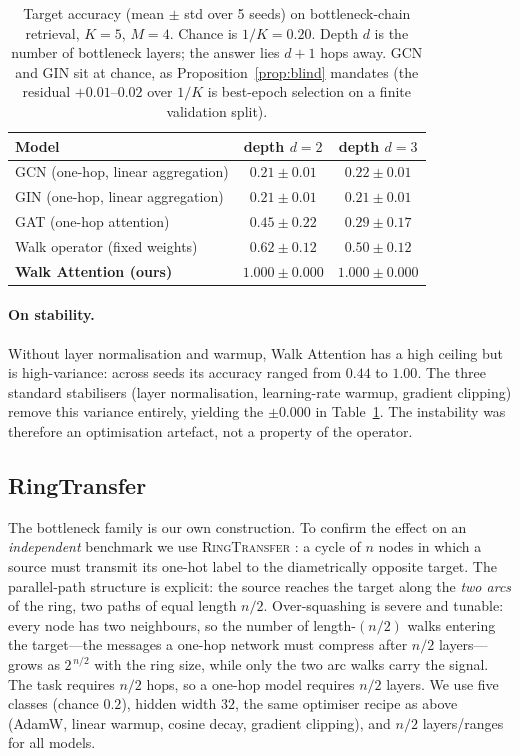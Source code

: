 \begin{table}[t]
\centering
\caption{Target accuracy (mean $\pm$ std over 5 seeds) on bottleneck-chain
retrieval, $K{=}5$, $M{=}4$. Chance is $1/K=0.20$. Depth $d$ is the number of
bottleneck layers; the answer lies $d{+}1$ hops away. GCN and GIN sit at
chance, as Proposition~\ref{prop:blind} mandates (the residual
$+0.01$--$0.02$ over $1/K$ is best-epoch selection on a finite validation
split).}
\label{tab:main}
\begin{tabular}{lcc}
\toprule
\textbf{Model} & \textbf{depth $d=2$} & \textbf{depth $d=3$} \\
\midrule
GCN (one-hop, linear aggregation)  & $0.21\pm0.01$ & $0.22\pm0.01$ \\
GIN (one-hop, linear aggregation)  & $0.21\pm0.01$ & $0.21\pm0.01$ \\
GAT (one-hop attention)            & $0.45\pm0.22$ & $0.29\pm0.17$ \\
Walk operator (fixed weights)      & $0.62\pm0.12$ & $0.50\pm0.12$ \\
\textbf{Walk Attention (ours)}     & $\mathbf{1.000\pm0.000}$ & $\mathbf{1.000\pm0.000}$ \\
\bottomrule
\end{tabular}
\end{table}

\paragraph{On stability.}
Without layer normalisation and warmup, Walk Attention has a high ceiling but is
high-variance: across seeds its accuracy ranged from $0.44$ to $1.00$. The three
standard stabilisers (layer normalisation, learning-rate warmup, gradient
clipping) remove this variance entirely, yielding the $\pm0.000$ in
Table~\ref{tab:main}. The instability was therefore an optimisation artefact, not
a property of the operator.

\subsection{RingTransfer}

The bottleneck family is our own construction. To confirm the effect on an
\emph{independent} benchmark we use \textsc{RingTransfer}
\cite{digiovanni2023oversquashing}: a cycle of $n$ nodes in which a source must
transmit its one-hot label to the diametrically opposite target. The
parallel-path structure is explicit: the source reaches the target along the
\emph{two arcs} of the ring, two paths of equal length $n/2$. Over-squashing is
severe and tunable: every node has two neighbours, so the number of
length-$(n/2)$ walks entering the target---the messages a one-hop network must
compress after $n/2$ layers---grows as $2^{\,n/2}$ with the ring size, while
only the two arc walks carry the signal. The task requires $n/2$ hops, so a
one-hop model requires $n/2$ layers. We use five classes (chance $0.2$), hidden
width $32$, the same optimiser recipe as above (AdamW, linear warmup, cosine
decay, gradient clipping), and $n/2$ layers/ranges for all models.

